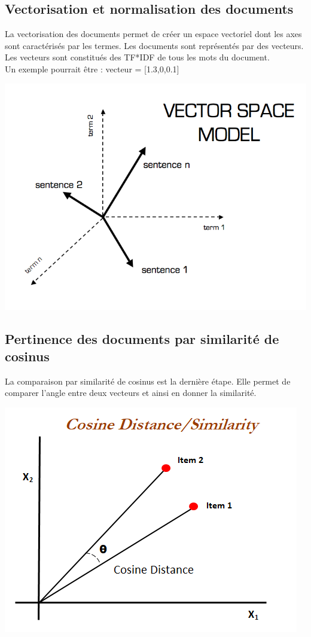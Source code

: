 \documentclass[11pt]{article}
\begin{document}
\subsection{Vectorisation et normalisation des documents}
La vectorisation des documents permet de créer un espace vectoriel dont les axes sont caractérisés par les termes. Les documents sont représentés par des vecteurs.  \\
Les vecteurs sont constitués des TF*IDF de tous les mots du document. \\
Un exemple pourrait être : vecteur = [1.3,0,0.1]
\begin{center}
\includegraphics[scale=0.45]{vector_space}
\end{center}
\subsection{Pertinence des documents par similarité de cosinus}
La comparaison par similarité de cosinus est la dernière étape. Elle permet de comparer l'angle entre deux vecteurs et ainsi en donner la similarité. 

\begin{center}
\includegraphics[scale=0.9]{cosinus}
\end{center}
\end{document}

